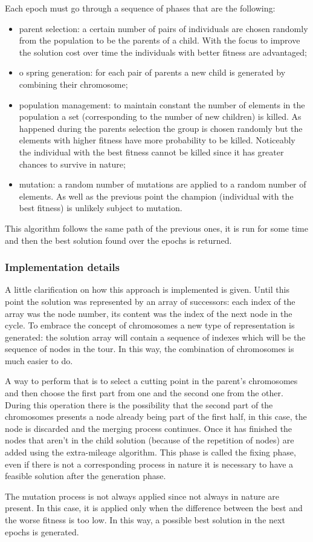 Each epoch must go through a sequence of phases that are the following:

\begin{itemize}
	\item parent selection: a certain number of pairs of individuals are chosen randomly from the population to be the parents of a child. With the focus to improve the solution cost over time the individuals with better fitness are advantaged;
	\item o spring generation: for each pair of parents a new child is generated by combining their chromosome;
	\item population management: to maintain constant the number of elements in the population a set (corresponding to the number of new children) is killed. As happened during the parents selection the group is chosen randomly but the elements with higher fitness have more probability to be killed. Noticeably the individual with the best fitness cannot be killed since it has greater chances to survive in nature;
	\item mutation: a random number of mutations are applied to a random number of elements. As well as the previous point the champion (individual with the best fitness) is unlikely subject to mutation.
\end{itemize}

This algorithm follows the same path of the previous ones, it is run for some time and then the best solution found over the epochs is returned.

\subsubsection{Implementation details}
\label{sec:implementation-genetic}
A little clarification on how this approach is implemented is given. Until this point the solution was represented by an array of successors: each index of the array was the node number, its content was the index of the next node in the cycle. To embrace the concept of chromosomes a new type of representation is generated: the solution array will contain a sequence of indexes which will be the sequence of nodes in the tour. In this way, the combination of chromosomes is much easier to
do. 

A way to perform that is to select a cutting point in the parent's chromosomes and then choose the first part from one and the second one from the other. During this operation there is the possibility that the second part of the chromosomes presents a node already being part of the first half, in this case, the node is discarded and the merging process continues. Once it has finished the nodes that aren't in the child solution (because of the repetition of nodes) are added using the extra-mileage algorithm. This phase is called the fixing phase, even if there is not a
corresponding process in nature it is necessary to have a feasible solution after the generation phase.

The mutation process is not always applied since not always in nature are present. In this case, it is applied only when the difference between the best and the worse fitness is too low. In this way, a possible best solution in the next epochs is generated.

